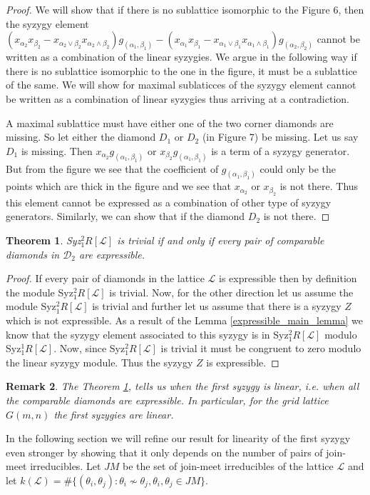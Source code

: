 \documentclass[10pt,reqno]{amsart}
\numberwithin{equation}{section}
\newtheorem{theorem}{Theorem}[section]
\newtheorem{remark}[theorem]{Remark}
\begin{document}
 \begin{proof}
We will show that if there is no sublattice isomorphic to the Figure 6, then the syzygy element
 $(x_{\alpha_2}x_{\beta_2}-x_{\alpha_2 \vee \beta_2}x_{\alpha_2 \wedge \beta_2})g_{(\alpha_1,\beta_1)}-
 (x_{\alpha_1}x_{\beta_1}-x_{\alpha_1 \vee \beta_1}x_{\alpha_1 \wedge \beta_1})g_{(\alpha_2,\beta_2)}$ cannot be written as a combination of the linear syzygies. We argue in the following way if there is no sublattice isomorphic to the one in the figure, it must be a sublattice of the same. We will show for maximal sublaticces of the syzygy element cannot be written as a combination of linear syzygies thus arriving at a contradiction.
 
 A maximal sublattice must have either one of the two corner diamonds are missing. So let either the diamond $D_1$ or $D_2$ (in Figure 7) be missing.  Let us say $D_1$ is missing.
 Then $x_{\alpha_2}g_{(\alpha_1,\beta_1)}$ or $x_{\beta_2}g_{(\alpha_1,\beta_1)}$ is a term of a syzygy generator. But from the 
 figure we see that the coefficient of $g_{(\alpha_1,\beta_1)}$ could only be the points which are thick in the figure
 and we see that $x_{\alpha_2}$ or $x_{\beta_2}$ is not there. Thus this element cannot be expressed as a combination of
 other type of syzygy generators. Similarly, we can show that if the diamond $D_2$ is not there.
 \end{proof}

\begin{theorem}
\label{main}
 Syz$^{2}_{1} R[\mathcal{L}]$ is trivial if and only if every pair of comparable diamonds in $\mathcal{D}_2$ are expressible.
 \end{theorem}
  \begin{proof}
  If every pair of diamonds in the lattice $\mathcal{L}$ is expressible then by definition the module Syz$_1^2R[\mathcal{L}]$ is trivial. Now, for the other direction let us assume the module Syz$_1^2R[\mathcal{L}]$ is trivial and further let us assume that there is a syzygy  $Z$ which is not expressible. As a result of the Lemma \ref{expressible_main_lemma} we know that the syzygy element associated to this syzygy is in Syz$_1^2R[\mathcal{L}]$ modulo Syz$_1^1R[\mathcal{L}]$. Now, since Syz$_1^2R[\mathcal{L}]$ is trivial it must be congruent to zero modulo the linear syzygy module. Thus the syzygy $Z$ is expressible. 
  \end{proof}
\begin{remark}\label{Grid-lattice}
The Theorem \ref{main}, tells us when the first syzygy is linear, i.e. when all the comparable diamonds are expressible. In particular, for the grid lattice $G(m,n)$ the first syzygies are linear. 
\end{remark}
In the following section we will refine our result for linearity of the first syzygy even stronger by showing that it only depends on the number of pairs of join-meet irreducibles. Let $JM$ be the set of join-meet irreducibles of the lattice $\mathcal{L}$ and let $k(\mathcal{L})=\# \{(\theta_i,\theta_j): \theta_i \nsim \theta_j, \theta_i,\theta_j \in JM\}$.
\end{document}
